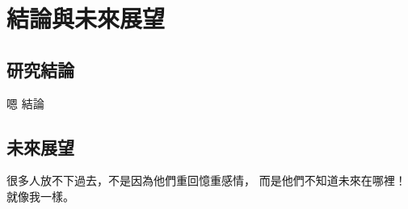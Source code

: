 

\chapter{結論與未來展望}\label{conclusion_and_future}

\section{研究結論}

嗯 結論

\section{未來展望}

很多人放不下過去，不是因為他們重回憶重感情，
而是他們不知道未來在哪裡！就像我一樣。
